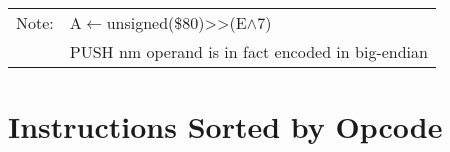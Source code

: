 \documentclass[oneside,a4paper]{book}
\newcommand{\notet}{\rule{0pt}{2.4ex}}
\newcommand{\noteb}{\rule[-1.3ex]{0pt}{0pt}}
\begin{document}
{\begin{tabular}{llcccccccccccccccl}
		\hline

		Note:

			& \multicolumn{17}{l}{\parbox{12cm}{\footnotemark[1] A$\leftarrow$unsigned(\$80)>>(E$\wedge$7)}}\notet \\

			& \multicolumn{17}{l}{\parbox{12cm}{\footnotemark[2] PUSH nm operand is in fact encoded in big-endian}}\noteb \\

		\hline

	\end{tabular}
}

\stopcontents[intrstructionsections]



\chapter{Instructions Sorted by Opcode}
\end{document}
